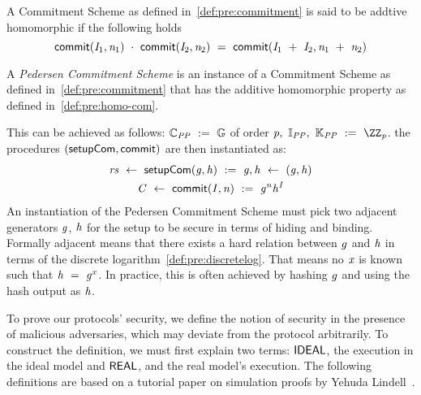 \begin{definition}\label{def:pre:homo-com}
    A Commitment Scheme as defined in~\cref{def:pre:commitment} is said to be addtive homomorphic if the following holds~\cite{bunz2018bulletproofs}
    \[ \mathsf{commit}(\mathit{I}_1, \mathit{n}_1) ~\cdot~ \mathsf{commit}(\mathit{I}_2, \mathit{n}_2) ~=~ \mathsf{commit}(\mathit{I}_1 ~+~ \mathit{I}_2, \mathit{n}_1 ~+~ \mathit{n}_2) \]
\end{definition}

\begin{definition}\label{def:pre:pedersen}
    A \emph{Pedersen Commitment Scheme} is an instance of a Commitment Scheme as defined in~\cref{def:pre:commitment} that has the additive homomorphic property as defined in~\cref{def:pre:homo-com}.

This can be achieved as follows:
    $\mathbb{C}_{\mathit{PP}} ~:=~ \mathbb{G}$ of order $\varPrime \opSeperate \varInputSpace_{\varPublicParam} \opSeperate \varRandSpace_{\varPublicParam} \opAssign \cnstIntegersPrime{\varPrime}$.
    the procedures $(\mathsf{setupCom}, \mathsf{commit})$ are then instantiated as:
    \begin{gather*}
        \mathit{rs} ~\leftarrow~ \mathsf{setupCom} (\mathit{g},\mathit{h}) ~:=~ \mathit{g}, \mathit{h} ~\leftarrow~ (\mathit{g}, \mathit{h})\\
        \mathit{C} ~\leftarrow~ \mathsf{commit}(\mathit{I}, \mathit{n}) ~:=~ \mathit{g}^{\mathit{n}} \mathit{h}^{\mathit{I}}\\
    \end{gather*}
    An instantiation of the Pedersen Commitment Scheme must pick two adjacent generators $\mathit{g}$, $\mathit{h}$ for the setup to be secure in terms of hiding and binding.
    Formally adjacent means that there exists a hard relation between $\mathit{g}$ and $\mathit{h}$ in terms of the discrete logarithm~\cref{def:pre:discretelog}.
That means no $\mathit{x}$ is known such that $\mathit{h} ~=~ \mathit{g}^{x}$.
    In practice, this is often achieved by hashing $\mathit{g}$ and using the hash output as $\mathit{h}$.

\end{definition}

To prove our protocols' security, we define the notion of security in the presence of malicious adversaries, which may deviate from the protocol arbitrarily.
To construct the definition, we must first explain two terms: $\mathsf{IDEAL}$, the execution in the ideal model and $\mathsf{REAL}$, and the real model's execution.
The following definitions are based on a tutorial paper on simulation proofs by Yehuda Lindell~\cite{lindell2017simulate}.

